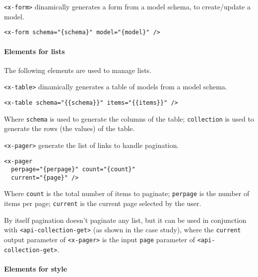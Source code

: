 \vspace{0.2cm}

\texttt{<x-form>}  dinamically generates a form from a model schema, to create/update a model.

\begin{lstlisting}[language=HTML5]
<x-form schema="{schema}" model="{model}" />
\end{lstlisting}

\paragraph{Elements for lists}

The following elements are used to manage lists. 

\vspace{0.2cm}

\texttt{<x-table>}  dinamically generates a table of models from a model schema. 

\begin{lstlisting}[language=HTML5]
<x-table schema="{{schema}}" items="{{items}}" />
\end{lstlisting}

Where \texttt{schema} is used to generate the columns of the table; 
\texttt{collection} is used to generate the rows (the values) of the table.

\vspace{0.2cm}

\texttt{<x-pager>} generate the list of links to handle pagination.

\begin{lstlisting}[language=HTML5]
<x-pager 
  perpage="{perpage}" count="{count}" 
  current="{page}" />
\end{lstlisting}

Where \texttt{count} is the total number of items to paginate; 
\texttt{perpage} is the number of items per page; 
\texttt{current} is the current page selected by the user.

By itself pagination doesn't paginate any list, but it can be used in conjunction with \texttt{<api-collection-get>} (as shown in the case study), where the \texttt{current} output parameter of \texttt{<x-pager>} is the input \texttt{page} parameter of \texttt{<api-collection-get>}.

\paragraph{Elements for style}

